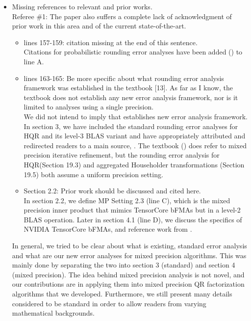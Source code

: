 \documentclass[10pt]{article}
\begin{document}
\begin{itemize}\bfseries
	\item Missing references to relevant and prior works.\\
	Referee \#1: The paper also suffers a complete lack of acknowledgment of prior work in this area and of the current state-of-the-art.
	\begin{itemize}\bfseries
		\item lines 157-159: citation missing at the end of this sentence. \\
		{\normalfont
		Citations for probabilistic rounding error analyses have been added (\cite{Higham2019a,Ipsen2019}) to line A. 
		}
		\item lines 163-165: Be more specific about what rounding error analysis framework was established in the textbook [13]. As far as I know, the textbook does not establish any new error analysis framework, nor is it limited to analyses using a single precision.\\
		{\normalfont
		We did not intend to imply that \cite{Higham2002} establishes new error analysis framework. 
		In section 3, we have included the standard rounding error analyses for HQR and its level-3 BLAS variant and have appropriately attributed and redirected readers to a main source, \cite{Higham2002}. 
		The textbook (\cite{Higham2002}) does refer to mixed precision iterative refinement, but the rounding error analysis for HQR(Section 19.3) and aggregated Householder transformations (Section 19.5) both assume a uniform precision setting. 
	    } 
		\item Section 2.2: Prior work should be discussed and cited here.\\
		{\normalfont
		In section 2.2, we define MP Setting 2.3 (line C), which is the mixed precision inner product that mimics TensorCore bFMAs but in a level-2 BLAS operation.
		Later in section 4.1 (line D), we discuss the specifics of NVIDIA TensorCore bFMAs, and reference work from \cite{Blanchard2019}. 
		}
	\end{itemize}
{\normalfont In general, we tried to be clear about what is existing, standard error analysis and what are our new error analyses for mixed precision algorithms.
This was mainly done by separating the two into section 3 (standard) and section 4 (mixed precision).
The idea behind mixed precision analysis is not novel, and our contributions are in applying them into mixed precision QR factorization algorithms that we developed. 
Furthermore, we still present many details considered to be standard in order to allow readers from varying mathematical backgrounds.}

\end{itemize}
\end{document}
